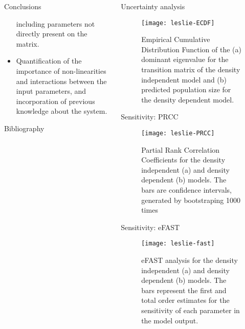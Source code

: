 \documentclass[final]{beamer}
\begin{document}
\begin{frame}{}
\begin{columns}[t]
\begin{column}{.48\linewidth}
\begin{block}{Conclusions}
\begin{itemize}
		including parameters not directly present on the matrix.
		\item Quantification of the importance of non-linearities and interactions between
		the input parameters, and incorporation of previous knowledge about the system.
		\end{itemize}
		\end{block}
		\vfill
        \begin{block}{Bibliography}
		
		\scriptsize{}
        \end{block}
      \end{column}
      \begin{column}{.48\linewidth}
        \begin{block}{Uncertainty analysis}
		\begin{figure}
		\begin{center}
		\texttt{[image: leslie-ECDF]}
		\end{center}
		\caption{Empirical Cumulative Distribution Function of the (a) dominant eigenvalue for the transition matrix of the density independent model and (b) predicted population size for the density dependent model.}
		\end{figure}
        \end{block}
		\vfill
        \begin{block}{Sensitivity: PRCC}
		\begin{figure}
		\begin{center}
		\texttt{[image: leslie-PRCC]}
		\end{center}
		\caption{Partial Rank Correlation Coefficients for the density independent (a) and density dependent (b) models. The bars are confidence intervals, generated by bootstraping 1000 times}
		\end{figure}
        \end{block}
		\vfill
        \begin{block}{Sensitivity: eFAST}
		\begin{figure}
		\begin{center}
		\texttt{[image: leslie-fast]}
		\end{center}
		\caption{eFAST analysis for the density independent (a) and density dependent (b) models. The bars represent the first and total order estimates for the sensitivity of each parameter in the model output.}
		\end{figure}
        \end{block}
      \end{column}
    \end{columns}
  \end{frame}
\end{document}
